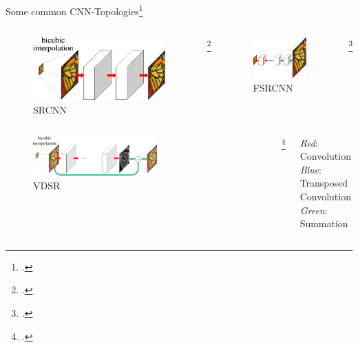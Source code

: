 \documentclass{beamer}
\begin{document}
\begin{frame}{Some common CNN-Topologies\footcite{LapSRN}}
\begin{columns}
\begin{column}{0.33\textwidth}
  \begin{figure}[h]
    \centering
    \includegraphics[height=0.4\textwidth]{sr_architectures_srcnn}
    \caption*{SRCNN\footnotemark}
  \end{figure}
\end{column} \footcitetext{Srcnn}\begin{column}{0.33\textwidth}
  \begin{figure}[h]
    \centering
    \includegraphics[height=0.4\textwidth]{sr_architectures_fsrcnn}
    \caption*{FSRCNN\footnotemark}
  \end{figure}
\end{column}
\footcitetext{Fsrcnn}
\end{columns}

\begin{columns}
\begin{column}{0.66\textwidth}
  \begin{figure}[h]
    \centering
    \includegraphics[width=0.6\textwidth]{sr_architectures_vdsr}
    \caption*{VDSR\footnotemark}
  \end{figure}
\end{column}
\footcitetext{Vdsr}
\begin{column}{0.34\textwidth}
  \textit{Red}: Convolution\\
  \textit{Blue}: Transposed Convolution\\
  \textit{Green}: Summation
\end{column}
\end{columns}
\end{frame}
\end{document}
